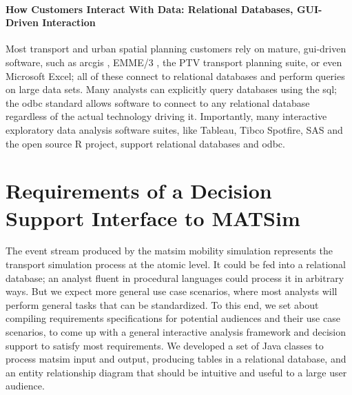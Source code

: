 \paragraph{How Customers Interact With Data: Relational Databases, GUI-Driven Interaction}
Most transport and urban spatial planning customers rely on mature, \gls{gui}-driven software, such as \gls{arcgis} \citep{ARC_GIS_2011}, EMME/3 \citep{EMME_Webpage_2015}, the PTV \citep{PTV_Webpage_2009} transport planning suite, or even Microsoft Excel; all of these connect to relational databases and perform queries on large data sets. Many analysts can explicitly query databases using the \gls{sql}; the \gls{odbc} standard allows software to connect to any relational database regardless of the actual technology driving it. Importantly, many interactive exploratory data analysis software suites, like Tableau, Tibco Spotfire, SAS and the open source R project, support relational databases and \gls{odbc}.

\section{Requirements of a Decision Support Interface to MATSim}
\label{sec:analyticsRequirements}
The event stream produced by the \gls{matsim} mobility simulation represents the transport simulation process at the atomic level. It could be fed into a relational database; an analyst fluent in procedural languages could process it in arbitrary ways. But we expect more general use case scenarios, where most analysts will perform general tasks that can be standardized. To this end, we set about compiling requirements specifications for potential audiences and their use case scenarios, to come up with a general interactive analysis framework and decision support to satisfy most requirements. We developed a set of Java classes to process \gls{matsim} input and output, producing tables in a relational database, and an entity relationship diagram that should be intuitive and useful to a large user audience.

